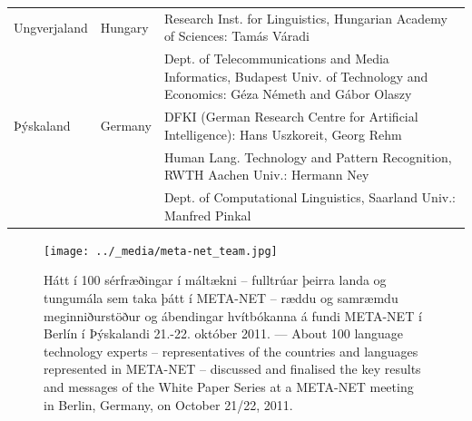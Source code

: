 \documentclass{../../metanetpaper}
\begin{document}
\begin{longtable}{llp{105mm}}
  Ungverjaland & \textcolor{grey1}{Hungary} & Research Inst. for Linguistics, Hungarian Academy of Sciences: Tamás Váradi\\  \addlinespace
  & & Dept. of Telecommunications and Media Informatics, Budapest Univ. of Technology and Economics: Géza Németh and Gábor Olaszy\\ \addlinespace
  Þýskaland & \textcolor{grey1}{Germany} & DFKI (German Research Centre for Artificial Intelligence): Hans Uszkoreit, Georg Rehm\\ \addlinespace
  & & Human Lang. Technology and Pattern Recognition, RWTH Aachen Univ.: Hermann Ney \\ \addlinespace
  & & Dept. of Computational Linguistics, Saarland Univ.: Manfred Pinkal
\end{longtable}
\normalsize

\renewcommand*{\figureformat}{}
\renewcommand*{\captionformat}{}

\begin{figure}[htbp]
  \center
  \texttt{[image: ../\_media/meta-net\_team.jpg]}
  \caption{Hátt í 100 sérfræðingar í máltækni -- fulltrúar þeirra landa og tungumála sem taka þátt í META-NET -- ræddu og samræmdu meginniðurstöður og ábendingar hvítbókanna á fundi META-NET í Berlín í Þýskalandi 21.-22. október 2011. --- \textcolor{grey1}{About 100 language technology experts -- representatives of the countries and languages represented in META-NET -- discussed and finalised the key results and messages of the White Paper Series at a META-NET meeting in Berlin, Germany, on October 21/22, 2011.}}
  \medskip
\end{figure}


\cleardoublepage

\label{whitepaperseries}
\end{document}
